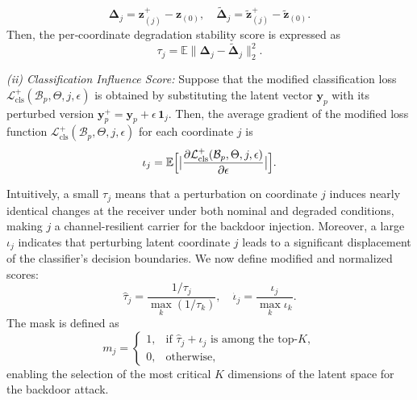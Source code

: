 \documentclass[journal]{IEEEtran}
\begin{document}
\begin{equation}
\boldsymbol{\Delta}_{j} = {\mathbf{z}}_{(j)}^{+} -  {\mathbf{z}}_{(0)},%
\quad
\tilde{\boldsymbol{\Delta}}_{j} = \tilde{{\mathbf{z}}}_{(j)}^{+} - \tilde{\mathbf{z}}_{(0)}.%
\end{equation}
Then, the per‐coordinate degradation stability score is expressed as
\begin{equation}
\tau_{j} = \mathbb{E}\bigl\|\boldsymbol{\Delta}_{j} - \tilde{\boldsymbol{\Delta}}_{j}\bigr\|_{2}^{2}.
\end{equation}


\emph{(ii) Classification Influence Score:} 
Suppose that the modified classification loss \(\mathcal{L}^{+}_{\mathrm{cls}}(\mathcal{B}_p, \Theta,j, \epsilon )\) is {obtained by substituting the latent vector } $\mathbf{y}_p$ with its perturbed version $\mathbf{y}_p^{+} = \mathbf{y}_p + \epsilon \,\mathbf{1}_j$. 
Then, the average gradient of the modified loss function \(\mathcal{L}^{+}_{\mathrm{cls}}(\mathcal{B}_p, \Theta,j, \epsilon )\)  for each coordinate $j$ is%
\begin{equation}
\iota_j = \mathbb{E}\Bigl[\bigl|\frac{\partial {\mathcal{L}}^{+}_{\mathrm{cls}}(\mathcal{B}_p, \Theta,j, \epsilon ) }{\partial \epsilon}\bigr|\Bigr].
\end{equation}





{Intuitively, a small $\tau_j$ means that a perturbation on coordinate $j$ induces nearly identical changes at the receiver under both nominal and degraded conditions, making $j$ a channel-resilient carrier for the backdoor injection. Moreover, a large $\iota_j$ indicates that perturbing latent coordinate $j$ 
leads to a significant displacement of the classifier's decision boundaries.}
We now  define modified and normalized scores:
\[
\hat\tau_{j} = \frac{1/\tau_{j}}{\max_{k}(1/\tau_{k})},
\quad
\hat\iota_{j} = \frac{\iota_{j}}{\max_{k}\iota_{k}}.
\]
The mask is defined as
\begin{equation}
m_{j} =
\begin{cases}
1, & \text{if \(\hat\tau_{j}+\hat\iota_{j}\) is among the top-}K,\\
0, & \text{otherwise},
\end{cases}
\end{equation}
enabling the selection of the most critical $K$ dimensions of the latent space for the backdoor attack.
\end{document}

